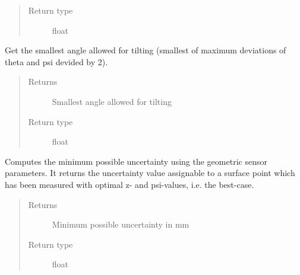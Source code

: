 \documentclass[letterpaper,10pt,english]{sphinxmanual}
\begin{document}
\begin{fulllineitems}
\begin{fulllineitems}
\begin{quote}
\begin{description}
\item[{Return type}] \leavevmode
float

\end{description}\end{quote}

\end{fulllineitems}


\begin{fulllineitems}
\label{\detokenize{module_sensor_model:agiprobot_measurement.sensor_model.SensorModel.get_median_deviation_angle}}
Get the smallest angle allowed for tilting (smallest of maximum deviations of theta and psi devided by 2).
\begin{quote}\begin{description}
\item[{Returns}] \leavevmode
Smallest angle allowed for tilting

\item[{Return type}] \leavevmode
float

\end{description}\end{quote}

\end{fulllineitems}


\begin{fulllineitems}
\label{\detokenize{module_sensor_model:agiprobot_measurement.sensor_model.SensorModel.get_min_uncertainty}}
Computes the minimum possible uncertainty using the geometric sensor parameters. It returns the uncertainty value assignable to
a surface point which has been measured with optimal z- and psi-values, i.e. the best-case.
\begin{quote}\begin{description}
\item[{Returns}] \leavevmode
Minimum possible uncertainty in mm

\item[{Return type}] \leavevmode
float

\end{description}\end{quote}


\end{fulllineitems}
\end{fulllineitems}
\end{document}
